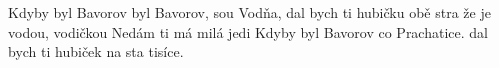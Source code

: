\begin{TEXT}{Kdyby byl Bavorov}
\SLOKA {} byl Bavorov, 
 sou Vodňa, 
dal bych ti hubičku 
 obě stra
\REFREN {} že je  vodou, 
 vodičkou 
Nedám ti má milá  jedi
\SLOKA Kdyby byl Bavorov
co Prachatice.
dal bych ti hubiček
na sta tisíce.
\end{TEXT}